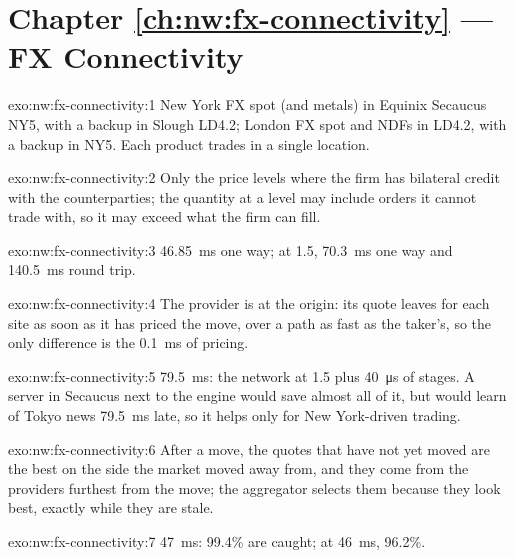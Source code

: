 \section*{Chapter \ref{ch:nw:fx-connectivity} --- FX Connectivity}

\begin{solution}{exo:nw:fx-connectivity:1}
New York FX spot (and metals) in Equinix Secaucus NY5, with a backup in Slough LD4.2; London FX spot and NDFs in LD4.2, with a backup
in NY5. Each product trades in a single location.
\end{solution}

\begin{solution}{exo:nw:fx-connectivity:2}
Only the price levels where the firm has bilateral credit with the counterparties; the quantity at a level may include orders it
cannot trade with, so it may exceed what the firm can fill.
\end{solution}

\begin{solution}{exo:nw:fx-connectivity:3}
\qty{46.85}{\milli\second} one way; at 1.5, \qty{70.3}{\milli\second} one way and \qty{140.5}{\milli\second} round trip.
\end{solution}

\begin{solution}{exo:nw:fx-connectivity:4}
The provider is at the origin: its quote leaves for each site as soon as it has priced the move, over a path as fast as the taker's, so
the only difference is the \qty{0.1}{\milli\second} of pricing.
\end{solution}

\begin{solution}{exo:nw:fx-connectivity:5}
\qty{79.5}{\milli\second}: the network at 1.5 plus \qty{40}{\micro\second} of stages. A server in Secaucus next to the engine would
save almost all of it, but would learn of Tokyo news \qty{79.5}{\milli\second} late, so it helps only for New York-driven trading.
\end{solution}

\begin{solution}{exo:nw:fx-connectivity:6}
After a move, the quotes that have not yet moved are the best on the side the market moved away from, and they come from the providers
furthest from the move; the aggregator selects them because they look best, exactly while they are stale.
\end{solution}

\begin{solution}{exo:nw:fx-connectivity:7}
\qty{47}{\milli\second}: 99.4\% are caught; at \qty{46}{\milli\second}, 96.2\%.
\end{solution}

